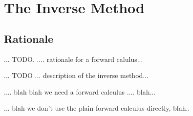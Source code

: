 \section{The Inverse Method}

\subsection{Rationale}

... TODO. .... rationale for a forward calulus...

... TODO ... description of the inverse method...


.... blah blah we need a forward calculus .... blah...

... blah we don't use the plain forward calculus directly, blah..





